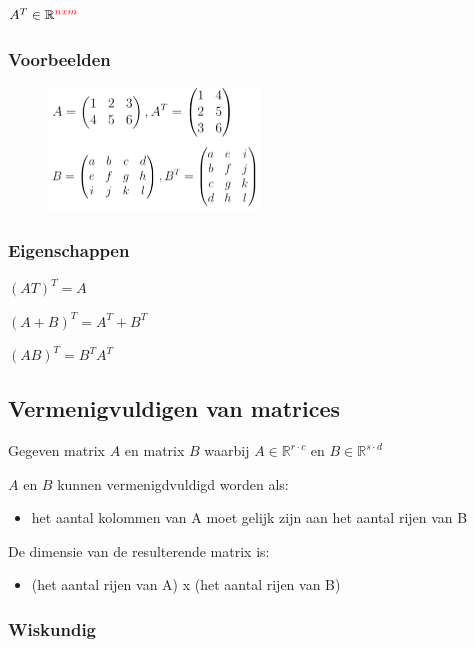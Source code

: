 \documentclass{article}
\begin{document}
$A^T \in \mathbb{R}^{\textcolor{red}{nxm}}$

\subsubsection{Voorbeelden}

\begin{figure}[H]
    \centering
    \includegraphics[width=0.5\textwidth]{matrix-getransponeerd-voorbeelden.png}
\end{figure}


\subsubsection{Eigenschappen}

$(AT)^T = A$

$(A + B)^T = A^T + B^T$

$(AB)^T = B^T A^T$

\subsection{Vermenigvuldigen van matrices}

Gegeven matrix $A$ en matrix $B$ waarbij $A \in \mathbb{R}^{r\cdot c}$ en $B \in \mathbb{R}^{s \cdot d}$

$A$ en $B$ kunnen vermenigdvuldigd worden als:

\begin{itemize}
    \item het aantal kolommen van A moet gelijk zijn aan het aantal rijen van B
\end{itemize}

De dimensie van de resulterende matrix is:

\begin{itemize}
    \item (het aantal rijen van A) x (het aantal rijen van B)
\end{itemize}

\subsubsection{Wiskundig}
\end{document}
